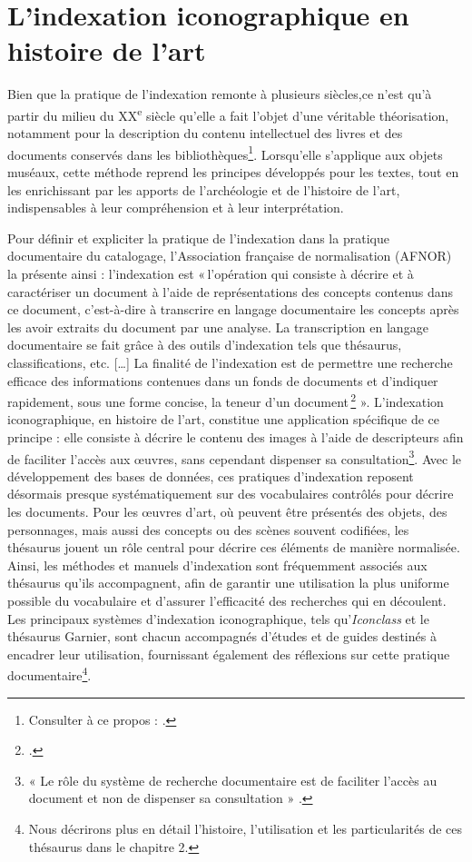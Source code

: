 \section{L'indexation iconographique en histoire de l’art}

Bien que la pratique de l’indexation remonte à plusieurs siècles,ce n’est qu’à partir du milieu du XX\textsuperscript{e} siècle qu’elle a fait l’objet d’une véritable théorisation, notamment pour la description du contenu intellectuel des livres et des documents conservés dans les bibliothèques\footnote{Consulter à ce propos : \cite{amarFondementsTheoriquesLindexation2000}.}. Lorsqu’elle s’applique aux objets muséaux, cette méthode reprend les principes développés pour les textes, tout en les enrichissant par les apports de l’archéologie et de l’histoire de l’art, indispensables à leur compréhension et à leur interprétation.

Pour définir et expliciter la pratique de l’indexation dans la pratique documentaire du catalogage, l'Association française de normalisation (AFNOR) la présente ainsi : l’indexation est « l’opération qui consiste à décrire et à caractériser un document à l’aide de représentations des concepts contenus dans ce document, c’est-à-dire à transcrire en langage documentaire les concepts après les avoir extraits du document par une analyse. La transcription en langage documentaire se fait grâce à des outils d’indexation tels que thésaurus, classifications, etc. […] La finalité de l’indexation est de permettre une recherche efficace des informations contenues dans un fonds de documents et d’indiquer rapidement, sous une forme concise, la teneur d’un document \footcite[norme NF Z47-102, vol. 1, p. 286]{associationfrancaisedenormalisationDocumentationRecueilNormes1993} ». L’indexation iconographique, en histoire de l’art, constitue une application spécifique de ce principe : elle consiste à décrire le contenu des images à l’aide de descripteurs afin de faciliter l’accès aux œuvres, sans cependant dispenser sa consultation\footnote{« Le rôle du système de recherche documentaire est de faciliter l’accès au document et non de dispenser sa consultation » \cite[p. 15]{garnierThesaurusIconographiqueSysteme1984}.}. Avec le développement des bases de données, ces pratiques d’indexation reposent désormais presque systématiquement sur des vocabulaires contrôlés pour décrire les documents. Pour les œuvres d'art, où peuvent être présentés des objets, des personnages, mais aussi des concepts ou des scènes souvent codifiées, les thésaurus jouent un rôle central pour décrire ces éléments de manière normalisée. Ainsi, les méthodes et manuels d’indexation sont fréquemment associés aux thésaurus qu’ils accompagnent, afin de garantir une utilisation la plus uniforme possible du vocabulaire et d'assurer l’efficacité des recherches qui en découlent. Les principaux systèmes d’indexation iconographique, tels qu’\textit{Iconclass} et le thésaurus Garnier, sont chacun accompagnés d’études et de guides destinés à encadrer leur utilisation, fournissant également des réflexions sur cette pratique documentaire\footnote{Nous décrirons plus en détail l'histoire, l'utilisation et les particularités de ces thésaurus dans le chapitre 2.}.

